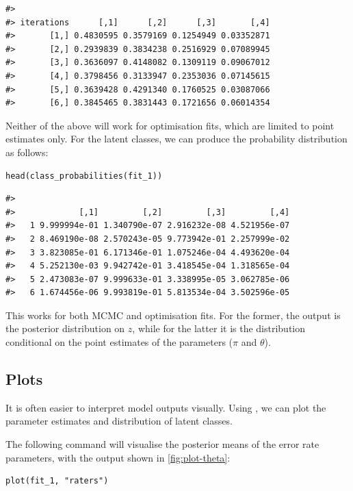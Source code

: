 \begin{verbatim}
#>           
#> iterations      [,1]      [,2]      [,3]       [,4]
#>       [1,] 0.4830595 0.3579169 0.1254949 0.03352871
#>       [2,] 0.2939839 0.3834238 0.2516929 0.07089945
#>       [3,] 0.3636097 0.4148082 0.1309119 0.09067012
#>       [4,] 0.3798456 0.3133947 0.2353036 0.07145615
#>       [5,] 0.3639428 0.4291340 0.1760525 0.03087066
#>       [6,] 0.3845465 0.3831443 0.1721656 0.06014354
\end{verbatim}

Neither of the above will work for optimisation fits, which are limited to
point estimates only. For the latent classes, we can produce the probability
distribution as follows:

\begin{verbatim}
head(class_probabilities(fit_1))
\end{verbatim}

\begin{verbatim}
#>    
#>             [,1]         [,2]         [,3]         [,4]
#>   1 9.999994e-01 1.340790e-07 2.916232e-08 4.521956e-07
#>   2 8.469190e-08 2.570243e-05 9.773942e-01 2.257999e-02
#>   3 3.823085e-01 6.171346e-01 1.075246e-04 4.493620e-04
#>   4 5.252130e-03 9.942742e-01 3.418545e-04 1.318565e-04
#>   5 2.473083e-07 9.999633e-01 3.338995e-05 3.062785e-06
#>   6 1.674456e-06 9.993819e-01 5.813534e-04 3.502596e-05
\end{verbatim}

This works for both MCMC and optimisation fits. For the former, the output is
the posterior distribution on \(z\), while for the latter it is the distribution
conditional on the point estimates of the parameters (\(\pi\) and \(\theta\)).

\hypertarget{plots}{%
\subsection{Plots}\label{plots}}

It is often easier to interpret model outputs visually.
Using , we can plot the parameter estimates and
distribution of latent classes.

The following command will visualise the posterior means of the error rate
parameters, with the output shown in \autoref{fig:plot-theta}:

\begin{verbatim}
plot(fit_1, "raters")
\end{verbatim}

